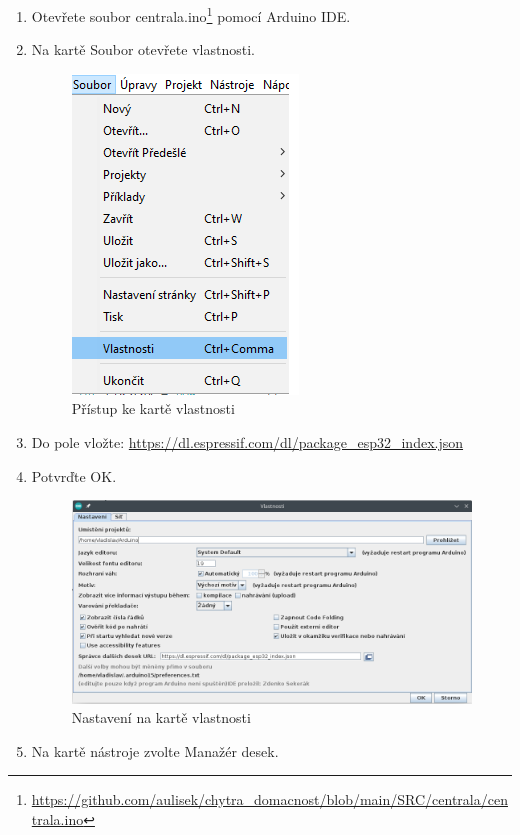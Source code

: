 \documentclass[11pt,a4paper,twoside,openright]{report}
\begin{document}
	\begin{enumerate}
		\item Otevřete soubor centrala.ino\footnote{\url{https://github.com/aulisek/chytra_domacnost/blob/main/SRC/centrala/centrala.ino}} pomocí Arduino IDE.
		\item Na kartě Soubor otevřete vlastnosti.
		\begin{figure}[h!]
			\centering
			\includegraphics[width=0.5\hsize]{img/navod_vlastnosti.png}
			\caption{Přístup ke  kartě vlastnosti}
		\end{figure}
		\item Do pole  vložte: \url{https://dl.espressif.com/dl/package_esp32_index.json}
		\item Potvrďte OK.
		\begin{figure}[h!]
			\centering
			\includegraphics[width=0.8\hsize]{img/navod_karta_vlastnosti.png}
			\caption{Nastavení na kartě vlastnosti}
		\end{figure}
		\item Na kartě nástroje zvolte Manažér desek.
		\begin{figure}[h!]

\end{figure}
\end{enumerate}
\end{document}
